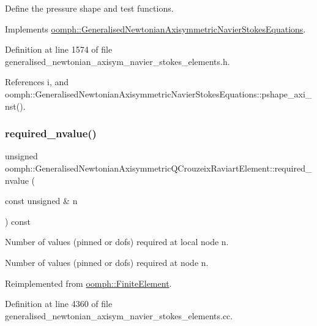 Define the pressure shape and test functions. 

Implements \hyperlink{classoomph_1_1GeneralisedNewtonianAxisymmetricNavierStokesEquations_a278087089b3cd5b354b57b997ce7a224}{oomph\+::\+Generalised\+Newtonian\+Axisymmetric\+Navier\+Stokes\+Equations}.



Definition at line 1574 of file generalised\+\_\+newtonian\+\_\+axisym\+\_\+navier\+\_\+stokes\+\_\+elements.\+h.



References i, and oomph\+::\+Generalised\+Newtonian\+Axisymmetric\+Navier\+Stokes\+Equations\+::pshape\+\_\+axi\+\_\+nst().

\mbox{\label{classoomph_1_1GeneralisedNewtonianAxisymmetricQCrouzeixRaviartElement_aa2a056b7c778f105ce71a2b4c884e6d7}} 
\subsubsection{\texorpdfstring{required\+\_\+nvalue()}{required\_nvalue()}}
{\footnotesize\ttfamily unsigned oomph\+::\+Generalised\+Newtonian\+Axisymmetric\+Q\+Crouzeix\+Raviart\+Element\+::required\+\_\+nvalue (\begin{DoxyParamCaption}\item[{const unsigned \&}]{n }\end{DoxyParamCaption}) const\hspace{0.3cm}{\ttfamily [virtual]}}



Number of values (pinned or dofs) required at local node n. 

Number of values (pinned or dofs) required at node n. 

Reimplemented from \hyperlink{classoomph_1_1FiniteElement_a56610c60d5bc2d7c27407a1455471b1a}{oomph\+::\+Finite\+Element}.



Definition at line 4360 of file generalised\+\_\+newtonian\+\_\+axisym\+\_\+navier\+\_\+stokes\+\_\+elements.\+cc.



